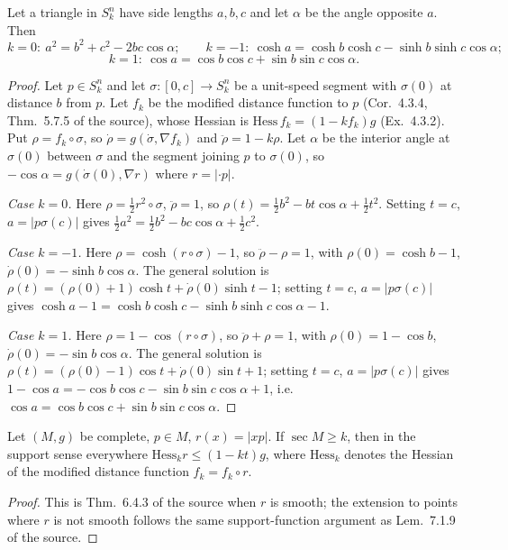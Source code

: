\begin{proposition}
  \label{prop:pet-ch12-law-of-cosines}
  Let a triangle in $S_k^n$ have side lengths $a,b,c$ and let $\alpha$ be the
  angle opposite $a$. Then
  \[
    k=0:\ a^2=b^2+c^2-2bc\cos\alpha;\qquad
    k=-1:\ \cosh a=\cosh b\cosh c-\sinh b\sinh c\cos\alpha;
  \]
  \[
    k=1:\ \cos a=\cos b\cos c+\sin b\sin c\cos\alpha.
  \]
\end{proposition}
\begin{proof}
  Let $p\in S_k^n$ and let $\sigma:[0,c]\to S_k^n$ be a unit-speed segment with
  $\sigma(0)$ at distance $b$ from $p$. Let $f_k$ be the modified distance
  function to $p$ (Cor.\ 4.3.4, Thm.\ 5.7.5 of the source), whose Hessian is
  $\mathrm{Hess}\,f_k=(1-kf_k)g$ (Ex.\ 4.3.2). Put $\rho=f_k\circ\sigma$, so
  $\dot\rho=g(\dot\sigma,\nabla f_k)$ and $\ddot\rho=1-k\rho$. Let $\alpha$ be the
  interior angle at $\sigma(0)$ between $\sigma$ and the segment joining $p$ to
  $\sigma(0)$, so $-\cos\alpha=g(\dot\sigma(0),\nabla r)$ where $r=|{\cdot}p|$.

  \emph{Case $k=0$.} Here $\rho=\tfrac12r^2\circ\sigma$, $\ddot\rho=1$, so
  $\rho(t)=\tfrac12b^2-b t\cos\alpha+\tfrac12t^2$. Setting $t=c$, $a=|p\sigma(c)|$
  gives $\tfrac12a^2=\tfrac12b^2-bc\cos\alpha+\tfrac12c^2$.

  \emph{Case $k=-1$.} Here $\rho=\cosh(r\circ\sigma)-1$, so
  $\ddot\rho-\rho=1$, with $\rho(0)=\cosh b-1$, $\dot\rho(0)=-\sinh b\cos\alpha$.
  The general solution is $\rho(t)=(\rho(0)+1)\cosh t+\dot\rho(0)\sinh t-1$;
  setting $t=c$, $a=|p\sigma(c)|$ gives
  $\cosh a-1=\cosh b\cosh c-\sinh b\sinh c\cos\alpha-1$.

  \emph{Case $k=1$.} Here $\rho=1-\cos(r\circ\sigma)$, so $\ddot\rho+\rho=1$,
  with $\rho(0)=1-\cos b$, $\dot\rho(0)=-\sin b\cos\alpha$. The general solution
  is $\rho(t)=(\rho(0)-1)\cos t+\dot\rho(0)\sin t+1$; setting $t=c$,
  $a=|p\sigma(c)|$ gives $1-\cos a=-\cos b\cos c-\sin b\sin c\cos\alpha+1$, i.e.\
  $\cos a=\cos b\cos c+\sin b\sin c\cos\alpha$.
\end{proof}

\begin{lemma}
  \label{lem:pet-ch12-hessian-comparison}
  Let $(M,g)$ be complete, $p\in M$, $r(x)=|xp|$. If $\sec M\ge k$, then in the
  support sense everywhere $\mathrm{Hess}_kr\le(1-kt)g$, where $\mathrm{Hess}_k$
  denotes the Hessian of the modified distance function $f_k=f_k\circ r$.
  \source{petersen:page-0466,petersen:page-0467}
\end{lemma}
\begin{proof}
  This is Thm.\ 6.4.3 of the source when $r$ is smooth; the extension to points
  where $r$ is not smooth follows the same support-function argument as
  Lem.\ 7.1.9 of the source.
\end{proof}

